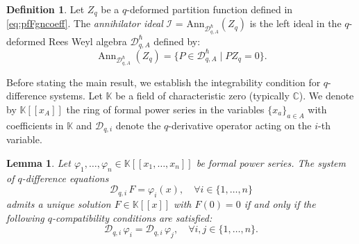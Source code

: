 \documentclass[reqno,11pt]{amsart}
\theoremstyle{plain}
\newtheorem{lemma}[theorem]{Lemma}
\theoremstyle{definition}
\newtheorem{definition}[theorem]{Definition}
\theoremstyle{remark}
\numberwithin{equation}{section}
\renewcommand{\phi}{\varphi}
\newcommand{\1}{\mathds{1}}
\newcommand{\2}{\frac{1}{2}}
\begin{document}
				\begin{definition}
					Let $Z_q$ be a { $q$-deformed} partition function defined in \eqref{eq:pfFgncoeff}. The \emph{annihilator ideal} $\mathcal{I}$ = {$\text{Ann}_{\mathcal{D}_{q,A}^\hslash}(Z_q)$ is the left ideal in the $q$-deformed Rees Weyl algebra $\mathcal{D}_{q,A}^\hslash$ defined by:} 
					\begin{equation}
						\operatorname{Ann}_{\mathcal{D}_{q,A}^\hslash}(Z_q) = \{ P \in \mathcal{D}_{q,A}^\hslash \mid P Z_q = 0 \}. 
					\end{equation}
				\end{definition}
				{Before stating the main result, we establish the integrability condition for $q$-difference systems.	Let $\mathbb{K}$ be a field of characteristic zero (typically $\mathbb{C}$). We denote by $\mathbb{K}[[x_A]]$ the ring of formal power series in the variables $\{x_a\}_{a \in A}$ with coefficients in $\mathbb{K}$ and $\mathcal{D}_{q,i}$ denote the $q$-derivative operator acting on the $i$-th variable.
					\begin{lemma}
						\label{lem:qPoincare_sym}
						Let $\phi_1, \dots, \phi_n \in \mathbb{K}[[x_1, \dots, x_n]]$ be formal power series. The system of $q$-difference equations 
						\begin{equation}
							\mathcal{D}_{q,i}\,F = \phi_i(x), \quad \forall i \in \{1, \dots, n\}
						\end{equation}
						admits a unique solution $F \in \mathbb{K}[[x]]$ with $F(0)=0$ if and only if the following $q$-compatibility conditions are satisfied:
						\begin{equation}
							\mathcal{D}_{q,i}\, \phi_i = \mathcal{D}_{q,i}\, \phi_j, \quad \forall i, j \in \{1, \dots, n\}.
						\end{equation}
					\end{lemma}
				
}
\end{document}
